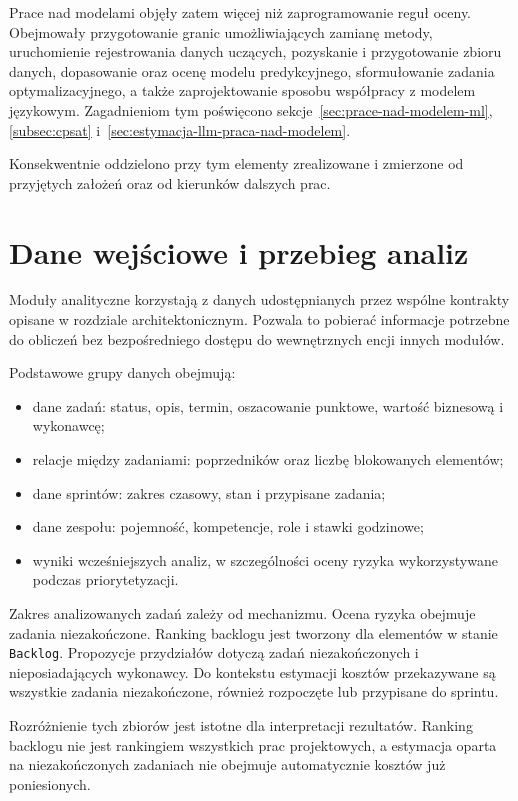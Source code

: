 Prace nad modelami objęły zatem więcej niż zaprogramowanie reguł oceny. Obejmowały przygotowanie granic umożliwiających zamianę metody, uruchomienie rejestrowania danych uczących, pozyskanie i przygotowanie zbioru danych, dopasowanie oraz ocenę modelu predykcyjnego, sformułowanie zadania optymalizacyjnego, a także zaprojektowanie sposobu współpracy z modelem językowym. Zagadnieniom tym poświęcono sekcje~\ref{sec:prace-nad-modelem-ml}, \ref{subsec:cpsat} i~\ref{sec:estymacja-llm-praca-nad-modelem}.

Konsekwentnie oddzielono przy tym elementy zrealizowane i zmierzone od przyjętych założeń oraz od kierunków dalszych prac.

\section{Dane wejściowe i przebieg analiz}

Moduły analityczne korzystają z danych udostępnianych przez wspólne kontrakty opisane w rozdziale architektonicznym. Pozwala to pobierać informacje potrzebne do obliczeń bez bezpośredniego dostępu do wewnętrznych encji innych modułów.

Podstawowe grupy danych obejmują:

\begin{itemize}
    \item dane zadań: status, opis, termin, oszacowanie punktowe, wartość biznesową i wykonawcę;
    \item relacje między zadaniami: poprzedników oraz liczbę blokowanych elementów;
    \item dane sprintów: zakres czasowy, stan i przypisane zadania;
    \item dane zespołu: pojemność, kompetencje, role i stawki godzinowe;
    \item wyniki wcześniejszych analiz, w szczególności oceny ryzyka wykorzystywane podczas priorytetyzacji.
\end{itemize}

Zakres analizowanych zadań zależy od mechanizmu. Ocena ryzyka obejmuje zadania niezakończone. Ranking backlogu jest tworzony dla elementów w stanie \texttt{Backlog}. Propozycje przydziałów dotyczą zadań niezakończonych i nieposiadających wykonawcy. Do kontekstu estymacji kosztów przekazywane są wszystkie zadania niezakończone, również rozpoczęte lub przypisane do sprintu.

Rozróżnienie tych zbiorów jest istotne dla interpretacji rezultatów. Ranking backlogu nie jest rankingiem wszystkich prac projektowych, a estymacja oparta na niezakończonych zadaniach nie obejmuje automatycznie kosztów już poniesionych.

